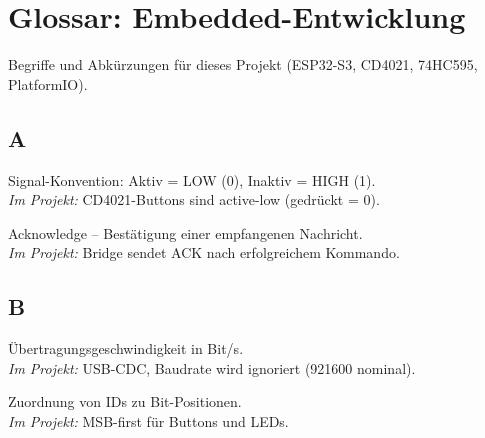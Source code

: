 
\section{Glossar: Embedded-Entwicklung}

Begriffe und Abkürzungen für dieses Projekt (ESP32-S3, CD4021, 74HC595, PlatformIO).

\subsection*{A}

\begin{description}[style=nextline, leftmargin=2.5cm, labelwidth=2.3cm]

\item[Active-Low]
Signal-Konvention: Aktiv = LOW (0), Inaktiv = HIGH (1).\\
\textit{Im Projekt:} CD4021-Buttons sind active-low (gedrückt = 0).

\item[ACK]
Acknowledge – Bestätigung einer empfangenen Nachricht.\\
\textit{Im Projekt:} Bridge sendet ACK nach erfolgreichem Kommando.

\end{description}

\subsection*{B}

\begin{description}[style=nextline, leftmargin=2.5cm, labelwidth=2.3cm]

\item[Baudrate]
Übertragungsgeschwindigkeit in Bit/s.\\
\textit{Im Projekt:} USB-CDC, Baudrate wird ignoriert (921600 nominal).

\item[Bit-Mapping]
Zuordnung von IDs zu Bit-Positionen.\\
\textit{Im Projekt:} MSB-first für Buttons und LEDs.

\end{description}

